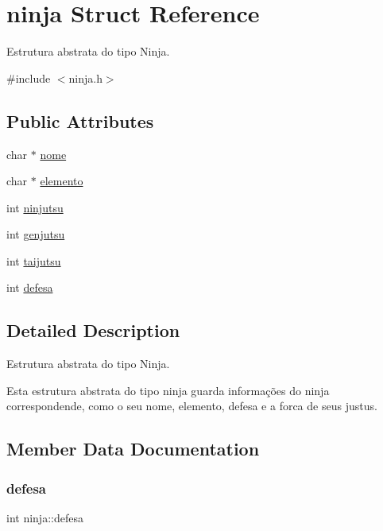 \hypertarget{structninja}{}\section{ninja Struct Reference}
\label{structninja}


Estrutura abstrata do tipo Ninja.  




{\ttfamily \#include $<$ninja.\+h$>$}

\subsection*{Public Attributes}
\begin{DoxyCompactItemize}
\item 
char $\ast$ \mbox{\hyperlink{structninja_a09c81900a27da1cf72d9b6f44b4051f2}{nome}}
\item 
char $\ast$ \mbox{\hyperlink{structninja_a0461035a441b95091803732b1bd4e76c}{elemento}}
\item 
int \mbox{\hyperlink{structninja_a6b840282381ec6145bc4c2ef512b4b74}{ninjutsu}}
\item 
int \mbox{\hyperlink{structninja_adfb9e88d0513d41d9750134763f2cccd}{genjutsu}}
\item 
int \mbox{\hyperlink{structninja_aceb226ee3b2a48bc1bdfc29237adb5e5}{taijutsu}}
\item 
int \mbox{\hyperlink{structninja_aedbaa968946c242cab4da6f5c68a9974}{defesa}}
\end{DoxyCompactItemize}


\subsection{Detailed Description}
Estrutura abstrata do tipo Ninja. 

Esta estrutura abstrata do tipo ninja guarda informações do ninja correspondende, como o seu nome, elemento, defesa e a forca de seus justus. 

\subsection{Member Data Documentation}
\mbox{\label{structninja_aedbaa968946c242cab4da6f5c68a9974}} 
\subsubsection{\texorpdfstring{defesa}{defesa}}
{\footnotesize\ttfamily int ninja\+::defesa}

